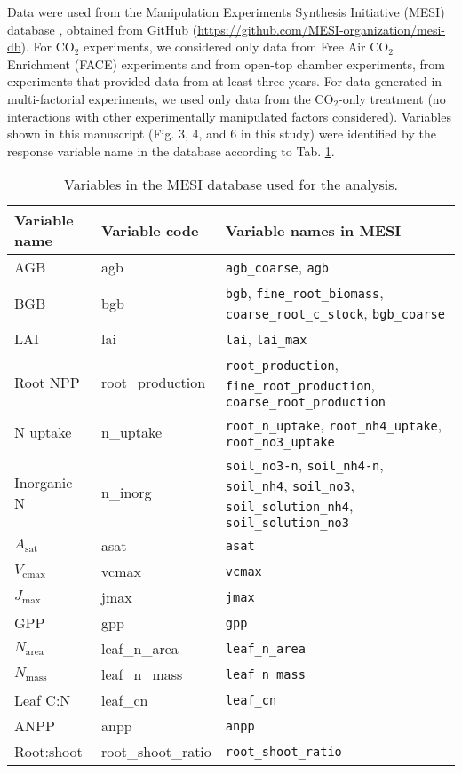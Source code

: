 \documentclass{myreport}
\begin{document}
Data were used from the Manipulation Experiments Synthesis Initiative (MESI) database \citep{vansundert_when_2023}, obtained from GitHub (\url{https://github.com/MESI-organization/mesi-db}). For CO$_2$ experiments, we considered only data from Free Air CO$_2$ Enrichment (FACE) experiments and from open-top chamber experiments, from experiments that provided data from at least three years. For data generated in multi-factorial experiments, we used only data from the CO$_2$-only treatment (no interactions with other experimentally manipulated factors considered). Variables shown in this manuscript (Fig. 3, 4, and 6 in this study) were identified by the response variable name in the database according to Tab. \ref{tab:varnams_mesi}.

\begin{table}
 \caption{Variables in the MESI database used for the analysis.}
\begin{tabular}{p{0.2\linewidth} p{0.2\linewidth} p{0.6\linewidth}}
  \toprule
  Variable name & Variable code & Variable names in MESI  \\
  \midrule
  AGB & agb & \texttt{agb\_coarse}, \texttt{agb} \\
  BGB & bgb & \texttt{bgb}, \texttt{fine\_root\_biomass}, \texttt{coarse\_root\_c\_stock}, \texttt{bgb\_coarse} \\
  LAI & lai & \texttt{lai}, \texttt{lai\_max} \\
  Root NPP & root\_production & \texttt{root\_production}, \texttt{fine\_root\_production}, \texttt{coarse\_root\_production} \\
  N uptake & n\_uptake & \texttt{root\_n\_uptake}, \texttt{root\_nh4\_uptake}, \texttt{root\_no3\_uptake} \\
  Inorganic N & n\_inorg & \texttt{soil\_no3-n}, \texttt{soil\_nh4-n}, \texttt{soil\_nh4}, \texttt{soil\_no3}, \texttt{soil\_solution\_nh4}, \texttt{soil\_solution\_no3} \\
  $A_\text{sat}$ & asat & \texttt{asat} \\
  $V_\text{cmax}$ & vcmax & \texttt{vcmax} \\
  $J_\text{max}$ & jmax & \texttt{jmax} \\
  GPP & gpp & \texttt{gpp} \\
  $N_\text{area}$ & leaf\_n\_area & \texttt{leaf\_n\_area} \\
  $N_\text{mass}$ & leaf\_n\_mass & \texttt{leaf\_n\_mass} \\
  Leaf C:N & leaf\_cn & \texttt{leaf\_cn} \\
  ANPP & anpp & \texttt{anpp} \\
  Root:shoot & root\_shoot\_ratio & \texttt{root\_shoot\_ratio} \\
  \bottomrule
\end{tabular}
\label{tab:varnams_mesi}
\end{table}
\end{document}
